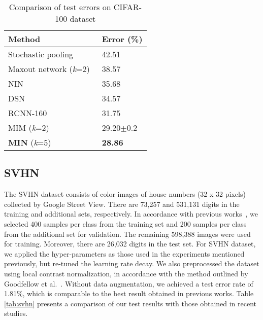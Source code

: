 \documentclass[10pt,twocolumn,letterpaper]{article}
\begin{document}
\begin{table}
\begin{center}
\caption{Comparison of test errors on CIFAR-100 dataset}
\begin{tabular}{|p{1.6in}|p{0.6in}|} \hline 
Method & Error (\%) \\ \hline 
Stochastic pooling~\cite{zeiler2013stochastic} & 42.51 \\ \hline 
Maxout network (\textit{k}=2)~\cite{goodfellow2013maxout} & 38.57 \\ \hline 
NIN~\cite{DBLP:journals/corr/LinCY13} & 35.68 \\ \hline 
DSN~\cite{lee2014deeply} & 34.57 \\ \hline 
RCNN-160~\cite{Liang_2015_CVPR} & 31.75 \\ \hline
MIM (\textit{k}=2)~\cite{liao2015importance} & 29.20$\pm $0.2 \\ \hline 
\textbf{MIN} (\textit{k}=5) & \textbf{28.86} \\ \hline
\end{tabular}
\label{tab:CIFAR100}
\end{center}
\end{table}

\subsection{SVHN}
 The SVHN dataset consists of color images of house numbers (32 x 32 pixels) collected by Google Street View. There are 73,257 and 531,131 digits in the training and additional sets, respectively. In accordance with previous works~\cite{goodfellow2013maxout}, we selected 400 samples per class from the training set and 200 samples per class from the additional set for validation. The remaining 598,388 images were used for training. Moreover, there are 26,032 digits in the test set. For SVHN dataset, we applied the hyper-parameters as those used in the experiments mentioned previously, but re-tuned the learning rate decay. We also preprocessed the dataset using local contrast normalization, in accordance with the method outlined by Goodfellow et al.~\cite{goodfellow2013maxout}. Without data augmentation, we achieved a test error rate of 1.81\%, which is comparable to the best result obtained in previous works. Table \ref{tab:svhn} presents a comparison of our test results with those obtained in recent studies.
\end{document}
